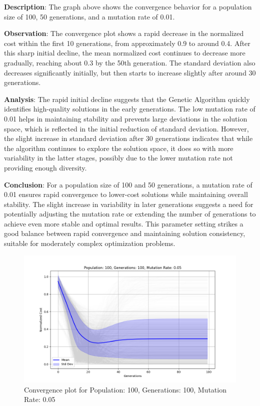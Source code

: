 \documentclass[
]{article}
\begin{document}
    \textbf{Description}: The graph above shows the convergence behavior for a population size of 100, 50 generations, and a mutation rate of 0.01.

    \textbf{Observation}: The convergence plot shows a rapid decrease in the normalized cost within the first 10 generations, from approximately 0.9 to around 0.4. After this sharp initial decline, the mean normalized cost continues to decrease more gradually, reaching about 0.3 by the 50th generation. The standard deviation also decreases significantly initially, but then starts to increase slightly after around 30 generations.

    \textbf{Analysis}: The rapid initial decline suggests that the Genetic Algorithm quickly identifies high-quality solutions in the early generations. The low mutation rate of 0.01 helps in maintaining stability and prevents large deviations in the solution space, which is reflected in the initial reduction of standard deviation. However, the slight increase in standard deviation after 30 generations indicates that while the algorithm continues to explore the solution space, it does so with more variability in the latter stages, possibly due to the lower mutation rate not providing enough diversity.

    \textbf{Conclusion}: For a population size of 100 and 50 generations, a mutation rate of 0.01 ensures rapid convergence to lower-cost solutions while maintaining overall stability. The slight increase in variability in later generations suggests a need for potentially adjusting the mutation rate or extending the number of generations to achieve even more stable and optimal results. This parameter setting strikes a good balance between rapid convergence and maintaining solution consistency, suitable for moderately complex optimization problems.

    \begin{figure}[H]
        \centering
        \includegraphics[width=\textwidth]{genetic_algorithm/Population_100_Generations_100_MutationRate_0.05}
        \caption{Convergence plot for Population: 100, Generations: 100, Mutation Rate: 0.05}
        \label{fig:ga_100_100_05}
    \end{figure}
\end{document}
